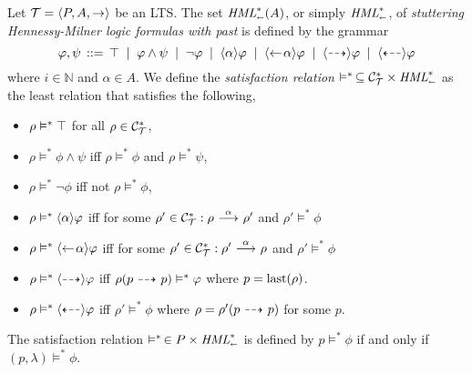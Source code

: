 \begin{definition}
    \label{dfn:hmlpast}
    Let $\mathcal{T}=\langle P,A,\rightarrow \rangle$ be an LTS. The set $\textit{HML}_\shortleftarrow^*(A)$,
    or simply $\textit{HML}_\shortleftarrow^*$, of
    \emph{stuttering Hennessy-Milner logic formulas with past}
    is defined by the grammar
    \[
        \varphi,\psi \,::=\, \top \;\;|\;\; \varphi\land\psi
                                \;\;|\;\; \neg\varphi
                                \;\;|\;\; \mbox{\ensuremath{\langle \alpha \rangle}} \varphi
                                \;\;|\;\; \mbox{\ensuremath{\langle\leftarrow\! \alpha \rangle}} \varphi
                                \;\;|\;\; \mbox{\ensuremath{\langle\stackrel{_{}}{\dashrightarrow}\rangle}} \varphi
                                \;\;|\;\; \mbox{\ensuremath{\langle\stackrel{_{}}{\dashleftarrow}\rangle}} \varphi
    \]
    where $i\in\mathbb{N}$ and $\alpha\in A$.
    We define the \emph{satisfaction relation} $\vDash^*\,\subseteq \mathcal{C}_{\mathcal{T}}^* \times \textit{HML}_\shortleftarrow^*$
    as the least relation that satisfies the following,
    \begin{itemize}
        \item $\rho\vDash^*\top$ for all $\rho\in\mathcal{C}_{\mathcal{T}}^*$,
        \item $\rho\vDash^*\phi\land\psi$ iff $\rho\vDash^*\phi$ and $\rho\vDash^*\psi$,
        \item $\rho\vDash^*\neg\phi$ iff not $\rho\vDash^*\phi$,
        \item $\rho\vDash^*\mbox{\ensuremath{\langle \alpha \rangle}}\varphi$ iff for some
              $\rho'\in\mathcal{C}_{\mathcal{T}}^* : \rho\ {\stackrel{{\alpha}}{\longrightarrow}}\ \rho'$ and $\rho'\vDash^*\phi$
        \item $\rho\vDash^*\mbox{\ensuremath{\langle\leftarrow\! \alpha \rangle}}\varphi$ iff for some
              $\rho'\in\mathcal{C}_{\mathcal{T}}^* : \rho'\ {\stackrel{{\alpha}}{\longrightarrow}}\ \rho$ and $\rho'\vDash^*\phi$
        \item $\rho\vDash^*\mbox{\ensuremath{\langle\stackrel{_{}}{\dashrightarrow}\rangle}}\varphi$ iff
              $\rho(p\ {\stackrel{_{}}{\dashrightarrow}}\  p) \vDash^* \varphi$ where $p=\operatorname{last}(\rho)$.
        \item $\rho\vDash^*\mbox{\ensuremath{\langle\stackrel{_{}}{\dashleftarrow}\rangle}}\varphi$ iff
              $\rho' \vDash^* \phi$ where $\rho = \rho'(p \ {\stackrel{_{}}{\dashrightarrow}}\  p)$ for some $p$.
    \end{itemize}
    The satisfaction relation $\vDash^*\,\in P\times\textit{HML}_\shortleftarrow^*$ is defined by
    $p\vDash^*\phi$ if and only if $(p,\lambda)\vDash^* \phi$.
\end{definition}

